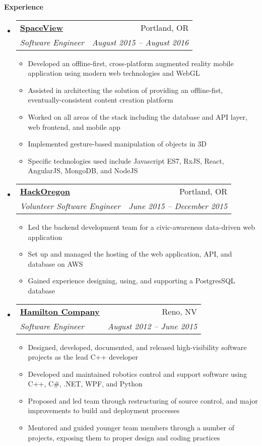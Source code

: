 \documentclass[letterpaper,11pt]{article}
\makeatletter
\newcommand{\resitem}[1]{\item #1 \vspace{-2pt}}
\newcommand{\resheading}[1]{{\normalsize \colorbox{mygrey}{\begin{minipage}{\textwidth}{\textbf{#1 \vphantom{p\^{E}}}}\end{minipage}}}}
\newcommand{\ressubheading}[4]{
\begin{tabular*}{6.5in}{l@{\extracolsep{\fill}}r}
		\textbf{#1} & #2 \\
		\textit{#3} & \textit{#4} \\
\end{tabular*}\vspace{-6pt}}
\makeatother
\begin{document}
\resheading{Experience}
	\begin{itemize}
		\item
			\ressubheading{\href{http://www.space.vu/}{SpaceView}}{Portland, OR}{Software Engineer}{August 2015 --
            August 2016}
				{ \footnotesize
				\begin{itemize}
					\resitem{Developed an offline-first, cross-platform augmented reality mobile application using modern web technologies and WebGL}
                    \resitem{Assisted in architecting the solution of providing an
                    offline-fist, eventually-consistent content creation platform}
                    \resitem{Worked on all areas of the stack including the database and API layer, web frontend, and mobile app}
                    \resitem{Implemented gesture-based manipulation of objects in 3D}
                    \resitem{Specific technologies used include Javascript ES7, RxJS, React, AngularJS, MongoDB, and NodeJS}
				\end{itemize}
				}
		\item
			\ressubheading{\href{http://www.hackoregon.org}{HackOregon}}{Portland, OR}{Volunteer Software Engineer}{June
            2015 -- December 2015}
				{ \footnotesize
				\begin{itemize}
					\resitem{Led the backend development team for a civic-awareness data-driven web application}
                    \resitem{Set up and managed the hosting of the web application, API, and database on AWS} 
                    \resitem{Gained experience designing, using, and supporting a PostgresSQL database}
				\end{itemize}
                }
			
		\item
			\ressubheading{\href{http://www.hamiltoncompany.com/}{Hamilton Company}}{Reno, NV}{Software Engineer}{August 2012 -- June 2015}
				{ \footnotesize
				\begin{itemize}
					\resitem{Designed, developed, documented, and released high-visibility software projects as the lead C++ developer}
					\resitem{Developed and maintained robotics control and support software using C++, C\#, .NET, WPF, and Python}
					\resitem{Proposed and led team through restructuring of source control, and major improvements to build and deployment processes}
					\resitem{Mentored and guided younger team members through a number of projects, exposing them to proper design and coding practices}
				\end{itemize}
				}


\end{itemize}
\end{document}
